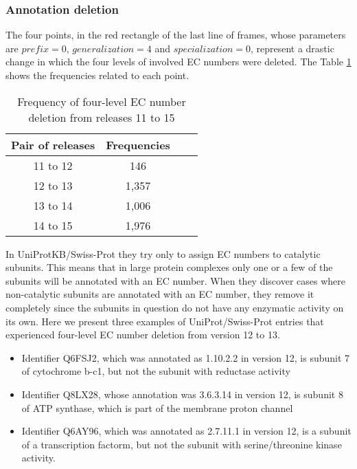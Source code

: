 \subsubsection{Annotation deletion}

The four points, in the red rectangle of the last line of frames, whose parameters are $prefix = 0$, $generalization = 4$ and $specialization = 0$, represent a drastic change in which the four levels of involved EC numbers were deleted. The Table \ref{four_deletion} shows the frequencies related to each point.

\begin{table}[!h]
  \caption{Frequency of four-level EC number deletion from releases 11 to 15}
  \label{four_deletion}
  \scriptsize
  \begin{center}
    \begin{tabular}{cccc}
      Pair of releases & Frequencies\\
    \hline
      11 to 12 & 146\\
      12 to 13 &  1,357\\
      13 to 14 & 1,006\\
      14 to 15 & 1,976
    \end{tabular}
  \end{center}
\end{table}

In  UniProtKB/Swiss-Prot they try only to assign EC numbers to catalytic subunits. This means that in large protein complexes only one or a few of the subunits will be annotated with an EC number. When they discover cases where non-catalytic subunits are annotated with an EC number, they remove it completely since the subunits in question do not have any enzymatic activity on its own. Here we present three examples of UniProt/Swiss-Prot entries that experienced four-level EC number deletion from version 12 to 13. 

\begin{itemize}
\item Identifier Q6FSJ2, which was annotated as 1.10.2.2 in version 12, is subunit 7 of cytochrome b-c1, but not the subunit with reductase activity
\item Identifier Q8LX28, whose annotation was 3.6.3.14 in version 12, is subunit 8 of ATP synthase, which is part of the membrane proton channel
\item Identifier Q6AY96, which was annotated as 2.7.11.1 in version 12, is a subunit of a transcription factorm, but not the subunit with serine/threonine kinase activity.
\end{itemize}

